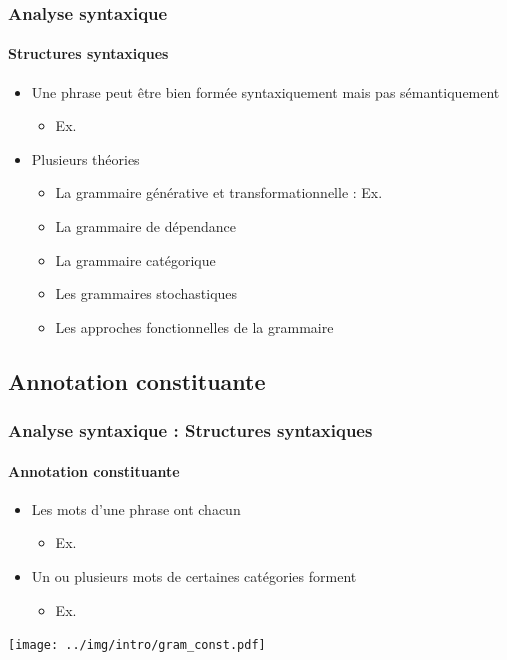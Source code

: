\documentclass[xcolor=table]{beamer}
\begin{document}
\begin{frame}
\frametitle{Analyse syntaxique}
\framesubtitle{Structures syntaxiques}

\begin{itemize}
	\item Une phrase peut être bien formée syntaxiquement mais pas sémantiquement 
	\begin{itemize}
		\item Ex. 
	\end{itemize}
	\item Plusieurs théories 
	\begin{itemize}
		\item La grammaire générative et transformationnelle : Ex. 
		\item La grammaire de dépendance 
		\item La grammaire catégorique
		\item Les grammaires stochastiques
		\item Les approches fonctionnelles de la grammaire
	\end{itemize}
	
\end{itemize}

\end{frame}


\subsection{Annotation constituante}

\begin{frame}
\frametitle{Analyse syntaxique : Structures syntaxiques}
\framesubtitle{Annotation constituante}

\begin{itemize}
	\item Les mots d'une phrase ont chacun 
	\begin{itemize}
		\item Ex. 
	\end{itemize}
	\item Un ou plusieurs mots de certaines catégories forment 
	\begin{itemize}
		\item Ex. 
	\end{itemize}
\end{itemize}

\begin{center}
	\texttt{[image: ../img/intro/gram\_const.pdf]}
\end{center}

\end{frame}
\end{document}
